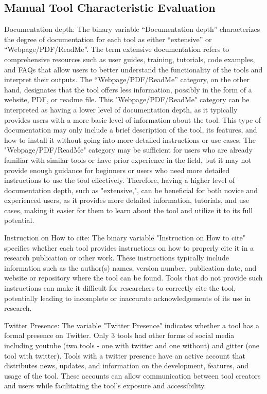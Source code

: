\documentclass{article}
\begin{document}
\subsection{Manual Tool Characteristic Evaluation}

Documentation depth: The binary variable “Documentation depth” characterizes the degree of documentation for each tool as either “extensive” or “Webpage/PDF/ReadMe”. The term extensive documentation refers to comprehensive resources such as user guides, training, tutorials, code examples, and FAQs that allow users to better understand the functionality of the tools and interpret their outputs. The “Webpage/PDF/ReadMe” category, on the other hand, designates that the tool offers less information, possibly in the form of a website, PDF, or readme file. This "Webpage/PDF/ReadMe" category can be interpreted as having a lower level of documentation depth, as it typically provides users with a more basic level of information about the tool. This type of documentation may only include a brief description of the tool, its features, and how to install it without going into more detailed instructions or use cases. The "Webpage/PDF/ReadMe" category may be sufficient for users who are already familiar with similar tools or have prior experience in the field, but it may not provide enough guidance for beginners or users who need more detailed instructions to use the tool effectively. Therefore, having a higher level of documentation depth, such as "extensive,", can be beneficial for both novice and experienced users, as it provides more detailed information, tutorials, and use cases, making it easier for them to learn about the tool and utilize it to its full potential.

Instruction on How to cite: The binary variable "Instruction on How to cite" specifies whether each tool provides instructions on how to properly cite it in a research publication or other work. These instructions typically include information such as the author(s) names, version number, publication date, and website or repository where the tool can be found. Tools that do not provide such instructions can make it difficult for researchers to correctly cite the tool, potentially leading to incomplete or inaccurate acknowledgements of its use in research.

Twitter Presence: The variable "Twitter Presence" indicates whether a tool has a formal presence on Twitter. Only 3 tools had other forms of social media including youtube (two tools - one with twitter and one without) and gitter (one tool with twitter). Tools with a twitter presence have an active account that distributes news, updates, and information on the development, features, and usage of the tool. These accounts can allow communication between tool creators and users while facilitating the tool's exposure and accessibility.
\end{document}
